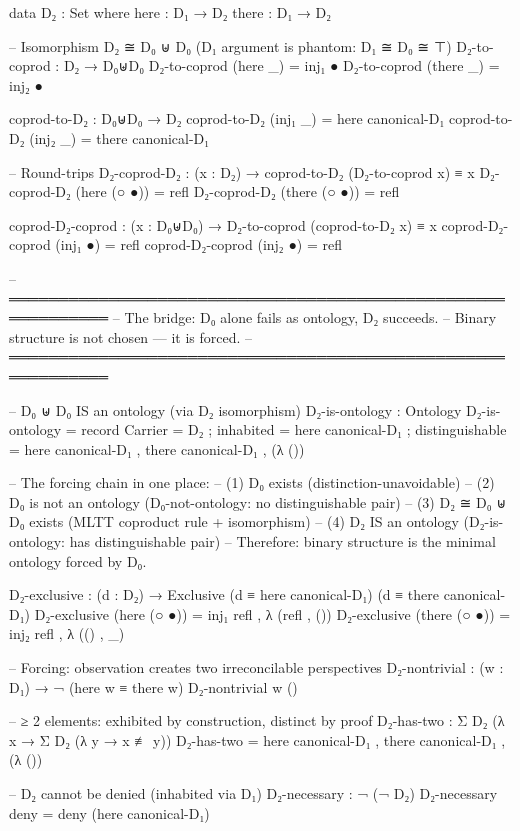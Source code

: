 \documentclass[11pt,a4paper]{article}
\begin{document}
\begin{code}
data D₂ : Set where
  here  : D₁ → D₂
  there : D₁ → D₂

-- Isomorphism D₂ ≅ D₀ ⊎ D₀  (D₁ argument is phantom: D₁ ≅ D₀ ≅ ⊤)
D₂-to-coprod : D₂ → D₀⊎D₀
D₂-to-coprod (here  _) = inj₁ ●
D₂-to-coprod (there _) = inj₂ ●

coprod-to-D₂ : D₀⊎D₀ → D₂
coprod-to-D₂ (inj₁ _) = here  canonical-D₁
coprod-to-D₂ (inj₂ _) = there canonical-D₁

-- Round-trips
D₂-coprod-D₂ : (x : D₂) → coprod-to-D₂ (D₂-to-coprod x) ≡ x
D₂-coprod-D₂ (here  (○ ●)) = refl
D₂-coprod-D₂ (there (○ ●)) = refl

coprod-D₂-coprod : (x : D₀⊎D₀) → D₂-to-coprod (coprod-to-D₂ x) ≡ x
coprod-D₂-coprod (inj₁ ●) = refl
coprod-D₂-coprod (inj₂ ●) = refl

-- ════════════════════════════════════════════════════════════
-- The bridge: D₀ alone fails as ontology, D₂ succeeds.
-- Binary structure is not chosen — it is forced.
-- ════════════════════════════════════════════════════════════

-- D₀ ⊎ D₀ IS an ontology (via D₂ isomorphism)
D₂-is-ontology : Ontology
D₂-is-ontology = record
  { Carrier         = D₂
  ; inhabited       = here canonical-D₁
  ; distinguishable = here canonical-D₁ , there canonical-D₁ , (λ ())
  }

-- The forcing chain in one place:
-- (1) D₀ exists           (distinction-unavoidable)
-- (2) D₀ is not an ontology (D₀-not-ontology: no distinguishable pair)
-- (3) D₂ ≅ D₀ ⊎ D₀ exists (MLTT coproduct rule + isomorphism)
-- (4) D₂ IS an ontology    (D₂-is-ontology: has distinguishable pair)
-- Therefore: binary structure is the minimal ontology forced by D₀.

D₂-exclusive : (d : D₂) → Exclusive (d ≡ here canonical-D₁) (d ≡ there canonical-D₁)
D₂-exclusive (here (○ ●))  = inj₁ refl , λ { (refl , ()) }
D₂-exclusive (there (○ ●)) = inj₂ refl , λ { (() , _) }

-- Forcing: observation creates two irreconcilable perspectives
D₂-nontrivial : (w : D₁) → ¬ (here w ≡ there w)
D₂-nontrivial w ()

-- ≥ 2 elements: exhibited by construction, distinct by proof
D₂-has-two : Σ D₂ (λ x → Σ D₂ (λ y → x ≢ y))
D₂-has-two = here canonical-D₁ , there canonical-D₁ , (λ ())

-- D₂ cannot be denied (inhabited via D₁)
D₂-necessary : ¬ (¬ D₂)
D₂-necessary deny = deny (here canonical-D₁)
\end{code}
\end{document}
